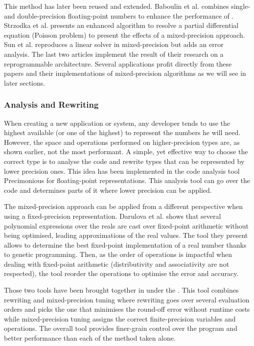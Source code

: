 This method has later been reused and extended. Baboulin et al. \cite{Baboulin2009} combines single- and double-precision floating-point numbers to enhance the performance of . Strzodka et al. \cite{Strzodka2006} presents an enhanced algorithm to resolve a partial differential equation (Poisson problem) to present the effects of a mixed-precision approach. Sun et al. \cite{Sun2008} reproduces a linear solver in mixed-precision but adds an error analysis. The last two articles implement the result of their research on a reprogrammable architecture. Several applications profit directly from these papers and their implementations of mixed-precision algorithms as we will see in later sections.

\subsubsection{Analysis and Rewriting}

When creating a new application or system, any developer tends to use the highest available (or one of the highest) to represent the numbers he will need. However, the space and operations performed on higher-precision types are, as shown earlier, not the most performant. A simple, yet effective way to choose the correct type is to analyse the code and rewrite types that can be represented by lower precision ones. This idea has been implemented in the code analysis tool Precimonious \cite{Rubio2013} for floating-point representations. This analysis tool can go over the code and determines parts of it where lower precision can be applied.

The mixed-precision approach can be applied from a different perspective when using a fixed-precision representation. Darulova et al. \cite{Darulova2013} shows that several polynomial expressions over the reals are cast over fixed-point arithmetic without being optimised, leading approximations of the real values. The tool they present allows to determine the best fixed-point implementation of a real number thanks to genetic programming. Then, as the order of operations is impactful when dealing with fixed-point arithmetic (distributivity and associativity are not respected), the tool reorder the operations to optimise the error and accuracy.

Those two tools have been brought together in \cite{Darulova2018} under the . This tool combines rewriting and mixed-precision tuning where rewriting goes over several evaluation orders and picks the one that minimises the round-off error without runtime costs while mixed-precision tuning assigns the correct finite-precision variables and operations. The overall tool provides finer-grain control over the program and better performance than each of the method taken alone.

